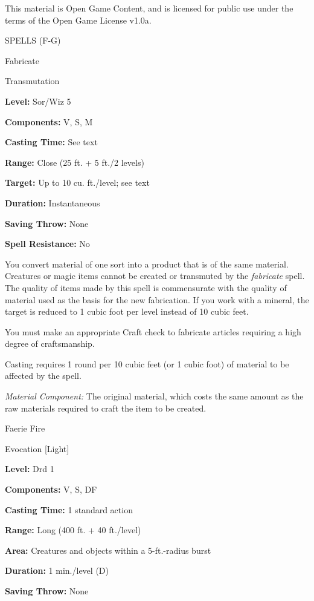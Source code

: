 \documentclass{article}
\begin{document}
This material is Open Game Content, and is licensed for public use under the terms 
of the Open Game License v1.0a.

{\LARGE{}SPELLS (F-G)}

\vspace{12pt}
Fabricate

Transmutation

\textbf{Level:} Sor/Wiz 5

\textbf{Components:} V, S, M

\textbf{Casting Time:} See text

\textbf{Range:} Close (25 ft. + 5 ft./2 levels)

\textbf{Target:} Up to 10 cu. ft./level; see text

\textbf{Duration:} Instantaneous

\textbf{Saving Throw:} None

\textbf{Spell Resistance:} No

You convert material of one sort into a product that is of the same material. Creatures 
or magic items cannot be created or transmuted by the \textit{fabricate }spell. 
The quality of items made by this spell is commensurate with the quality of material 
used as the basis for the new fabrication. If you work with a mineral, the target 
is reduced to 1 cubic foot per level instead of 10 cubic feet.

You must make an appropriate Craft check to fabricate articles requiring a high 
degree of craftsmanship.

Casting requires 1 round per 10 cubic feet (or 1 cubic foot) of material to be 
affected by the spell.

\textit{Material Component: }The original material, which costs the same amount 
as the raw materials required to craft the item to be created.

\vspace{12pt}
Faerie Fire

Evocation [Light]

\textbf{Level:} Drd 1

\textbf{Components:} V, S, DF

\textbf{Casting Time:} 1 standard action

\textbf{Range:} Long (400 ft. + 40 ft./level)

\textbf{Area:} Creatures and objects within a 5-ft.-radius burst

\textbf{Duration:} 1 min./level (D)

\textbf{Saving Throw:} None
\end{document}
